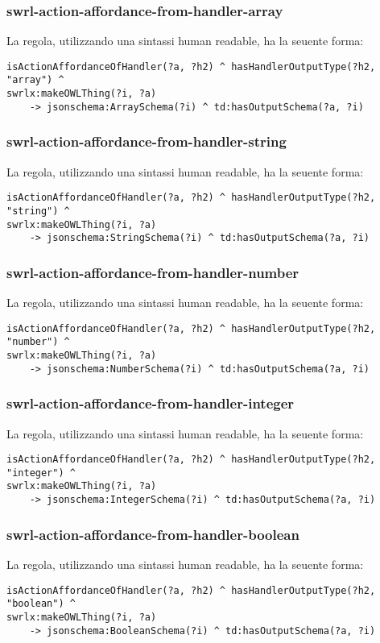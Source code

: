 \subsubsection{swrl-action-affordance-from-handler-array}
La regola, utilizzando una sintassi human readable, ha la seuente forma:
\begin{verbatim}
isActionAffordanceOfHandler(?a, ?h2) ^ hasHandlerOutputType(?h2, "array") ^
swrlx:makeOWLThing(?i, ?a)
	-> jsonschema:ArraySchema(?i) ^ td:hasOutputSchema(?a, ?i)
\end{verbatim}

\subsubsection{swrl-action-affordance-from-handler-string}
La regola, utilizzando una sintassi human readable, ha la seuente forma:
\begin{verbatim}
isActionAffordanceOfHandler(?a, ?h2) ^ hasHandlerOutputType(?h2, "string") ^
swrlx:makeOWLThing(?i, ?a)
	-> jsonschema:StringSchema(?i) ^ td:hasOutputSchema(?a, ?i)
\end{verbatim}

\subsubsection{swrl-action-affordance-from-handler-number}
La regola, utilizzando una sintassi human readable, ha la seuente forma:
\begin{verbatim}
isActionAffordanceOfHandler(?a, ?h2) ^ hasHandlerOutputType(?h2, "number") ^
swrlx:makeOWLThing(?i, ?a)
	-> jsonschema:NumberSchema(?i) ^ td:hasOutputSchema(?a, ?i)
\end{verbatim}

\subsubsection{swrl-action-affordance-from-handler-integer}
La regola, utilizzando una sintassi human readable, ha la seuente forma:
\begin{verbatim}
isActionAffordanceOfHandler(?a, ?h2) ^ hasHandlerOutputType(?h2, "integer") ^
swrlx:makeOWLThing(?i, ?a)
	-> jsonschema:IntegerSchema(?i) ^ td:hasOutputSchema(?a, ?i)
\end{verbatim}

\subsubsection{swrl-action-affordance-from-handler-boolean}
La regola, utilizzando una sintassi human readable, ha la seuente forma:
\begin{verbatim}
isActionAffordanceOfHandler(?a, ?h2) ^ hasHandlerOutputType(?h2, "boolean") ^
swrlx:makeOWLThing(?i, ?a)
	-> jsonschema:BooleanSchema(?i) ^ td:hasOutputSchema(?a, ?i)
\end{verbatim}

